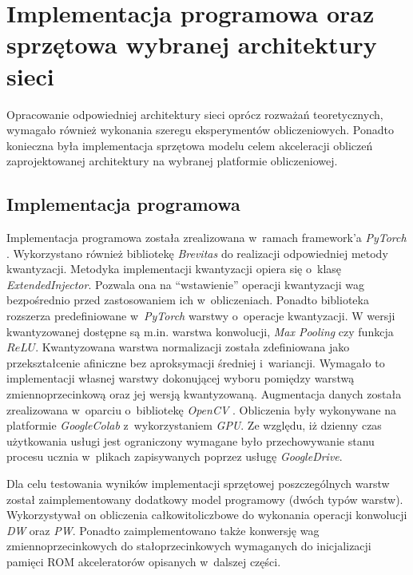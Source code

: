 \chapter{Implementacja programowa oraz sprzętowa wybranej architektury sieci}
\label{cha:Implementacja}

Opracowanie odpowiedniej architektury sieci oprócz rozważań teoretycznych, wymagało również wykonania szeregu eksperymentów obliczeniowych.
Ponadto konieczna była implementacja sprzętowa modelu celem akceleracji obliczeń zaprojektowanej architektury na wybranej platformie obliczeniowej.

\section{Implementacja programowa}

Implementacja programowa została zrealizowana w~ramach framework'a \emph{PyTorch} \cite{pytorch}.
Wykorzystano również bibliotekę \emph{Brevitas} \cite{brevitas} do realizacji odpowiedniej metody kwantyzacji.
Metodyka implementacji kwantyzacji opiera się o~klasę \emph{ExtendedInjector}.
Pozwala ona na ``wstawienie'' operacji kwantyzacji wag bezpośrednio przed zastosowaniem ich w~obliczeniach.
Ponadto biblioteka rozszerza predefiniowane w~\emph{PyTorch} warstwy o~operacje kwantyzacji. 
W wersji kwantyzowanej dostępne są m.in. warstwa konwolucji, \emph{Max Pooling} czy funkcja $ReLU$.
Kwantyzowana warstwa normalizacji została zdefiniowana jako przekształcenie afiniczne bez aproksymacji średniej i~wariancji.
Wymagało to implementacji własnej warstwy dokonującej wyboru pomiędzy warstwą zmiennoprzecinkową oraz jej wersją kwantyzowaną.
Augmentacja danych została zrealizowana w~oparciu o~bibliotekę \emph{OpenCV} \cite{opencv}.
Obliczenia były wykonywane na platformie \emph{GoogleColab} \cite{colab} z~wykorzystaniem \emph{GPU}.
Ze względu, iż dzienny czas użytkowania usługi jest ograniczony wymagane było przechowywanie stanu procesu ucznia w~plikach zapisywanych poprzez usługę \emph{GoogleDrive}.


Dla celu testowania wyników implementacji sprzętowej poszczególnych warstw został zaimplementowany dodatkowy model programowy (dwóch typów warstw). 
Wykorzystywał on obliczenia całkowitoliczbowe do wykonania operacji konwolucji \emph{DW} oraz \emph{PW}.
Ponadto zaimplementowano także konwersję wag zmiennoprzecinkowych do stałoprzecinkowych wymaganych do inicjalizacji pamięci ROM akceleratorów opisanych w~dalszej części.

